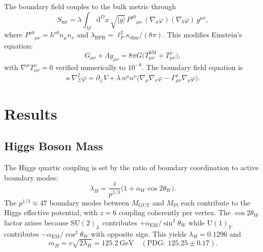 \documentclass[prd,twocolumn,amsmath,amssymb]{revtex4-2}
\begin{document}
The boundary field couples to the bulk metric through
\begin{equation}\label{eq:Sint}
S_{\mathrm{int}} = \lambda \int_M \mathrm{d}^D x\,\sqrt{|g|}\, P^{ab}{}_{\mu\nu}\,(\nabla_a\varphi)(\nabla_b\varphi)\,g^{\mu\nu},
\end{equation}
where $P^{ab}{}_{\mu\nu} = h^{ab}n_\mu n_\nu$ and $\lambda_{\mathrm{BPR}} = \ell_P^2\kappa_{\mathrm{dim}}/(8\pi)$. This modifies Einstein's equation:
\begin{equation}\label{eq:G}
G_{\mu\nu} + \Lambda g_{\mu\nu} = 8\pi G\bigl(T^{\mathrm{SM}}_{\mu\nu} + T^{\varphi}_{\mu\nu}\bigr),
\end{equation}
with $\nabla^\mu T^\varphi_{\mu\nu} = 0$ verified numerically to $10^{-8}$. The boundary field equation is
\begin{equation}\label{eq:field}
\kappa\,\nabla^2_\Sigma\varphi = \partial_\varphi V + \lambda\, n^\mu n^\nu\bigl(\nabla_\mu\nabla_\nu\varphi - \Gamma^\rho_{\mu\nu}\nabla_\rho\varphi\bigr).
\end{equation}

\section{Results}
\label{sec:results}

\subsection{Higgs Boson Mass}
\label{sec:higgs}

The Higgs quartic coupling is set by the ratio of boundary coordination to active boundary modes:
\begin{equation}\label{eq:higgs}
\lambda_H = \frac{z}{p^{1/3}}\bigl(1 + \alpha_W\cos 2\theta_W\bigr).
\end{equation}
The $p^{1/3} \approx 47$ boundary modes between $M_{\mathrm{GUT}}$ and $M_{\mathrm{Pl}}$ each contribute to the Higgs effective potential, with $z = 6$ coupling coherently per vertex. The $\cos 2\theta_W$ factor arises because $\mathrm{SU}(2)_L$ contributes $+\alpha_{\mathrm{EM}}/\sin^2\theta_W$ while $\mathrm{U}(1)_Y$ contributes $-\alpha_{\mathrm{EM}}/\cos^2\theta_W$ with opposite sign. This yields $\lambda_H = 0.1296$ and
\begin{equation}
m_H = v\sqrt{2\lambda_H} = 125.2~\mathrm{GeV}\quad(\mathrm{PDG:}~125.25 \pm 0.17).
\end{equation}
\end{document}
